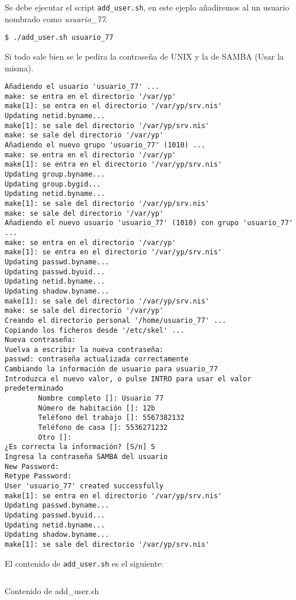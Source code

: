 \documentclass[../main.tex]{subfiles}
\begin{document}
Se debe ejecutar el script \texttt{add\_user.sh},
en este ejeplo añadiremos al un usuario nombrado como
\textit{usuario\_77}.

\begin{listing}[H]
\begin{verbatim}
$ ./add_user.sh usuario_77
\end{verbatim}
\end{listing}

Si todo sale bien se le pedira la contraseña de UNIX y
la de \Gls{SAMBA} (Usar la misma).

\begin{verbatim}
Añadiendo el usuario 'usuario_77' ...
make: se entra en el directorio '/var/yp'
make[1]: se entra en el directorio '/var/yp/srv.nis'
Updating netid.byname...
make[1]: se sale del directorio '/var/yp/srv.nis'
make: se sale del directorio '/var/yp'
Añadiendo el nuevo grupo 'usuario_77' (1010) ...
make: se entra en el directorio '/var/yp'
make[1]: se entra en el directorio '/var/yp/srv.nis'
Updating group.byname...
Updating group.bygid...
Updating netid.byname...
make[1]: se sale del directorio '/var/yp/srv.nis'
make: se sale del directorio '/var/yp'
Añadiendo el nuevo usuario 'usuario_77' (1010) con grupo 'usuario_77' ...
make: se entra en el directorio '/var/yp'
make[1]: se entra en el directorio '/var/yp/srv.nis'
Updating passwd.byname...
Updating passwd.byuid...
Updating netid.byname...
Updating shadow.byname...
make[1]: se sale del directorio '/var/yp/srv.nis'
make: se sale del directorio '/var/yp'
Creando el directorio personal '/home/usuario_77' ...
Copiando los ficheros desde '/etc/skel' ...
Nueva contraseña:
Vuelva a escribir la nueva contraseña:
passwd: contraseña actualizada correctamente
Cambiando la información de usuario para usuario_77
Introduzca el nuevo valor, o pulse INTRO para usar el valor predeterminado
        Nombre completo []: Usuario 77
        Número de habitación []: 12b
        Teléfono del trabajo []: 5567382132
        Teléfono de casa []: 5536271232
        Otro []:
¿Es correcta la información? [S/n] S
Ingresa la contraseña SAMBA del usuario
New Password:
Retype Password:
User 'usuario_77' created successfully
make[1]: se entra en el directorio '/var/yp/srv.nis'
Updating passwd.byname...
Updating passwd.byuid...
Updating netid.byname...
Updating shadow.byname...
make[1]: se sale del directorio '/var/yp/srv.nis'
\end{verbatim}

El contenido de \texttt{add\_user.sh} es el siguiente:
\begin{listing}[H]
\inputminted{bash}{../configs/add_user.sh}
\caption{Contenido de add\_user.sh}
\label{listing:adduser.sh}
\end{listing}
\end{document}
